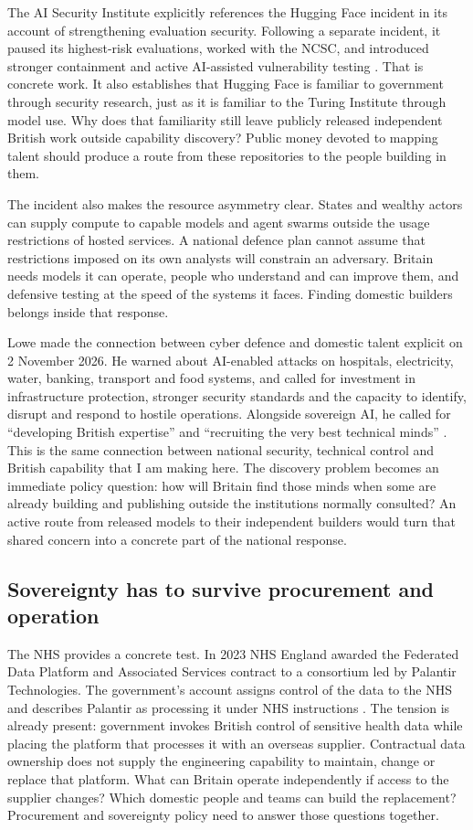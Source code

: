 The AI Security Institute explicitly references the Hugging Face incident
in its account of strengthening evaluation security. Following a separate
incident, it paused its highest-risk evaluations, worked with the NCSC,
and introduced stronger containment and active AI-assisted vulnerability
testing \cite{aisisecurity2026}. That is concrete work. It also establishes
that Hugging Face is familiar to government through security research,
just as it is familiar to the Turing Institute through model use. Why does
that familiarity still leave publicly released independent British work
outside capability discovery? Public money devoted to mapping talent
should produce a route from these repositories to the people building in
them.

The incident also makes the resource asymmetry clear. States and wealthy
actors can supply compute to capable models and agent swarms outside the
usage restrictions of hosted services. A national defence plan cannot
assume that restrictions imposed on its own analysts will constrain an
adversary. Britain needs models it can operate, people who understand and
can improve them, and defensive testing at the speed of the systems it
faces. Finding domestic builders belongs inside that response.

Lowe made the connection between cyber defence and domestic talent
explicit on 2 November 2026. He warned about AI-enabled attacks on
hospitals, electricity, water, banking, transport and food systems, and
called for investment in infrastructure protection, stronger security
standards and the capacity to identify, disrupt and respond to hostile
operations. Alongside sovereign AI, he called for ``developing British
expertise'' and ``recruiting the very best technical minds''
\cite{lowecyber2026}. This is the same connection between national security,
technical control and British capability that I am making here. The
discovery problem becomes an immediate policy question: how will Britain
find those minds when some are already building and publishing outside
the institutions normally consulted? An active route from released models
to their independent builders would turn that shared concern into a
concrete part of the national response.

\subsection{Sovereignty has to survive procurement and operation}
The NHS provides a concrete test. In 2023 NHS England awarded the Federated
Data Platform and Associated Services contract to a consortium led by
Palantir Technologies. The government's account assigns control of the
data to the NHS and describes Palantir as processing it under NHS
instructions \cite{nhspalantir2025}. The tension is already present:
government invokes British control of sensitive health data while placing
the platform that processes it with an overseas supplier. Contractual
data ownership does not supply the engineering capability to maintain,
change or replace that platform. What can Britain operate independently
if access to the supplier changes? Which domestic people and teams can
build the replacement? Procurement and sovereignty policy need to answer
those questions together.

